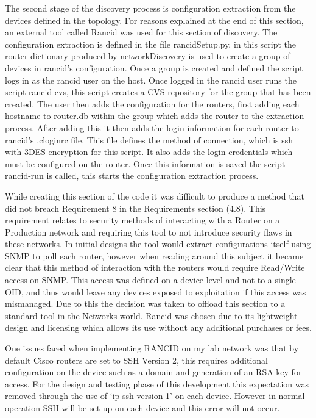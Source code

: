 \documentclass[11pt]{report}
\begin{document}
The second stage of the discovery process is configuration extraction from the devices defined in the topology. For reasons explained at the end of this section, an external tool called Rancid \citep{Rancid} was used for this section of discovery. The configuration extraction is defined in the file rancidSetup.py, in this script the router dictionary produced by networkDiscovery is used to create a group of devices in rancid's configuration. Once a group is created and defined the script logs in as the rancid user on the host. Once logged in the rancid user runs the script rancid-cvs, this script creates a CVS repository for the group that has been created. The user then adds the configuration for the routers, first adding each hostname to router.db within the group which adds the router to the extraction process. After adding this it then adds the login information for each router to rancid's .cloginrc file. This file defines the method of connection, which is ssh with 3DES encryption for this script. It also adds the login credentials which must be configured on the router. Once this information is saved the script rancid-run is called, this starts the configuration extraction process.

While creating this section of the code it was difficult to produce a method that did not breach Requirement 8 in the Requirements section (4.8). This requirement relates to security methods of interacting with a Router on a Production network and requiring this tool to not introduce security flaws in these networks. In initial designs the tool would extract configurations itself using SNMP to poll each router, however when reading around this subject it became clear that this method of interaction with the routers would require Read/Write access on SNMP. This access was defined on a device level and not to a single OID, and thus would leave any devices exposed to exploitation if this access was mismanaged. Due to this the decision was taken to offload this section to a standard tool in the Networks world. Rancid was chosen due to its lightweight design and licensing which allows its use without any additional purchases or fees.

One issues faced when implementing RANCID on my lab network was that by default Cisco routers are set to SSH Version 2, this requires additional configuration on the device such as a domain and generation of an RSA key for access. For the design and testing phase of this development this expectation was removed through the use of `ip ssh version 1' on each device. However in normal operation SSH will be set up on each device and this error will not occur.
\end{document}
